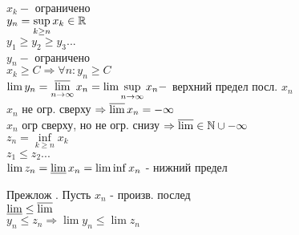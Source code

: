 

\begin{definition}
$ x_k - $ ограничено \\
$ y_n = \sup\limits_{k \geq n} x_k \in \mathbb{R} $ \\
$ y_1 \geq y_2 \geq y_3 ...$\\
$ y_n - $ ограничено \\
$ x_k \geq C \Rightarrow \forall n : y_n \geq C $ \\
$ \lim y_n = \varlimsup\limits_{n \rightarrow \infty} x_n = \lim\sup\limits_{n \rightarrow \infty} x_n  - $ верхний предел посл. $ x_n $ \\
$ x_n $ не огр. сверху $ \Rightarrow \varlimsup x_n = -\infty $\\
$ x_n $ огр сверху, но не огр. снизу $ \Rightarrow \varlimsup \in \mathbb{N} \cup -\infty $ \\
$ z_n = \inf\limits_{k \geq n} x_k $ \\
$ z_1 \leq z_2 ... $\\
$ \lim z_n = \varliminf x_n = \lim\inf x_n $ - нижний предел 
\end{definition}
Прежлож . Пусть $x_n$ - произв. послед \\
$ \varliminf \leq \varlimsup $\\
$ y_n \leq z_n \Rightarrow \lim y_n \leq \lim z_n $ \\


